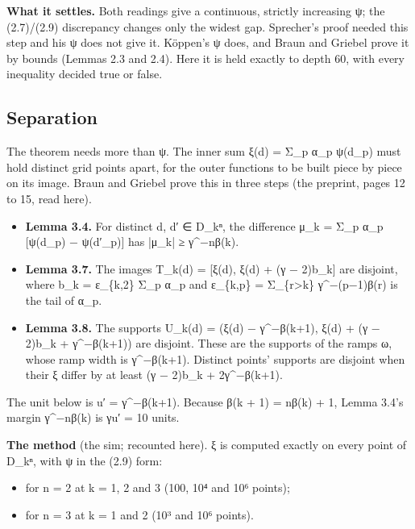 \textbf{What it settles.} Both readings give a continuous, strictly increasing ψ; the (2.7)/(2.9) discrepancy changes only the widest gap. Sprecher's proof needed this step and his ψ does not give it. Köppen's ψ does, and Braun and Griebel prove it by bounds (Lemmas 2.3 and 2.4). Here it is held exactly to depth 60, with every inequality decided true or false.

\subsection{\texorpdfstring{Separation}{Separation}}

The theorem needs more than ψ. The inner sum ξ(d) = Σ\_\allowbreak{}p α\_\allowbreak{}p ψ(d\_\allowbreak{}p) must hold distinct grid points apart, for the outer functions to be built piece by piece on its image. Braun and Griebel prove this in three steps (the preprint, pages 12 to 15, read here).

\begin{itemize}
\item \textbf{Lemma 3.4.} For distinct d, d′ ∈ D\_\allowbreak{}kⁿ, the difference μ\_\allowbreak{}k = Σ\_\allowbreak{}p α\_\allowbreak{}p [ψ(d\_\allowbreak{}p) − ψ(d′\_\allowbreak{}p)] has |μ\_\allowbreak{}k| ≥ γ\textasciicircum{}−nβ(k).
\item \textbf{Lemma 3.7.} The images T\_\allowbreak{}k(d) = [ξ(d), ξ(d) + (γ − 2)b\_\allowbreak{}k] are disjoint, where b\_\allowbreak{}k = ε\_\allowbreak{}\{k,2\} Σ\_\allowbreak{}p α\_\allowbreak{}p and ε\_\allowbreak{}\{k,p\} = Σ\_\allowbreak{}\{r>k\} γ\textasciicircum{}−(p−1)β(r) is the tail of α\_\allowbreak{}p.
\item \textbf{Lemma 3.8.} The supports U\_\allowbreak{}k(d) = (ξ(d) − γ\textasciicircum{}−β(k+1), ξ(d) + (γ − 2)b\_\allowbreak{}k + γ\textasciicircum{}−β(k+1)) are disjoint. These are the supports of the ramps ω, whose ramp width is γ\textasciicircum{}−β(k+1). Distinct points' supports are disjoint when their ξ differ by at least (γ − 2)b\_\allowbreak{}k + 2γ\textasciicircum{}−β(k+1).
\end{itemize}

The unit below is u′ = γ\textasciicircum{}−β(k+1). Because β(k + 1) = nβ(k) + 1, Lemma 3.4's margin γ\textasciicircum{}−nβ(k) is γu′ = 10 units.

\textbf{The method} (the sim; recounted here). ξ is computed exactly on every point of D\_\allowbreak{}kⁿ, with ψ in the (2.9) form:

\begin{itemize}
\item for n = 2 at k = 1, 2 and 3 (100, 10⁴ and 10⁶ points);
\item for n = 3 at k = 1 and 2 (10³ and 10⁶ points).
\end{itemize}


